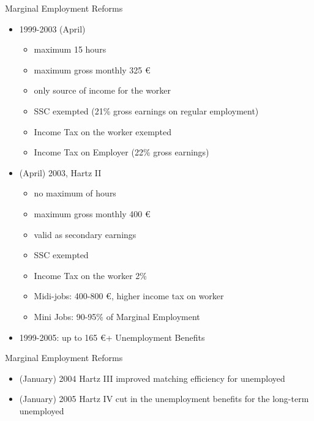 \documentclass{beamer}
\begin{document}
\begin{frame}{Marginal Employment Reforms}\label{Marginal_Employment}
\begin{itemize}
\setlength{\itemsep}{0.5 cm}
\item 1999-2003 (April)
\begin{itemize}
\item maximum 15 hours
\item maximum gross monthly 325 \euro
\item only source of income for the worker
\item SSC exempted (21\% gross earnings on regular employment)
\item Income Tax on the worker exempted 
\item Income Tax on Employer (22\% gross earnings) 
\end{itemize}
\item (April) 2003, Hartz II
\begin{itemize}
\item no maximum of hours
\item maximum gross monthly 400 \euro
\item valid as secondary earnings 
\item SSC exempted%
\item Income Tax on the worker 2\%
\item Midi-jobs: 400-800 \euro, higher income tax on worker
\item Mini Jobs: 90-95\% of Marginal Employment
\end{itemize}
\item 1999-2005: up to 165 \euro + Unemployment Benefits
\end{itemize}
\hyperlink{Share_Marginal_Employment}{}
\end{frame}

\begin{frame}{Marginal Employment Reforms}
\begin{itemize}
\setlength{\itemsep}{0.5 cm}
\item (January) 2004 Hartz III improved matching efficiency for unemployed
\item (January) 2005 Hartz IV cut in the unemployment benefits for the long-term unemployed
\end{itemize}
\end{frame}
\end{document}
